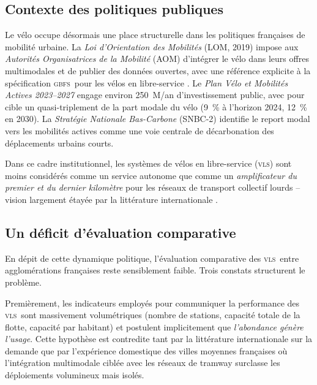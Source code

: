 \documentclass[11pt,a4paper]{article}
\newcommand{\VLS}{\textsc{vls}\xspace}
\newcommand{\GBFS}{\textsc{gbfs}\xspace}
\begin{document}
\subsection{Contexte des politiques publiques}
\label{sec:contexte-politique}

Le vélo occupe désormais une place structurelle dans les
politiques françaises de mobilité urbaine. La \emph{Loi
d'Orientation des Mobilités} (LOM, 2019) impose aux \emph{Autorités
Organisatrices de la Mobilité} (AOM) d'intégrer le vélo dans leurs
offres multimodales et de publier des données ouvertes, avec une
référence explicite à la spécification \GBFS\ pour les vélos en
libre-service \citep{Mobi2024}. Le \emph{Plan Vélo et Mobilités
Actives 2023--2027} engage environ \num{250}~M\EUR{}/an
d'investissement public, avec pour cible un quasi-triplement de
la part modale du vélo (\SI{9}{\percent} à l'horizon 2024,
\SI{12}{\percent} en 2030). La \emph{Stratégie Nationale
Bas-Carbone} (SNBC-2) identifie le report modal vers les
mobilités actives comme une voie centrale de décarbonation des
déplacements urbains courts.

Dans ce cadre institutionnel, les systèmes de vélos en
libre-service (\VLS) sont moins considérés comme un service
autonome que comme un \emph{amplificateur du premier et du dernier
kilomètre} pour les réseaux de transport collectif lourds
\citep{Fishman2016, Saberi2018} -- vision largement étayée par la
littérature internationale \citep{Pucher2010, Buehler2012}.

\subsection{Un déficit d'évaluation comparative}
\label{sec:contexte-eval}

En dépit de cette dynamique politique, l'évaluation comparative
des \VLS\ entre agglomérations françaises reste sensiblement
faible. Trois constats structurent le problème.

Premièrement, les indicateurs employés pour communiquer la
performance des \VLS\ sont massivement volumétriques (nombre de
stations, capacité totale de la flotte, capacité par habitant) et
postulent implicitement que \emph{l'abondance génère l'usage}.
Cette hypothèse est contredite tant par la littérature
internationale sur la demande \citep{FaghihImani2014,
FaghihImani2015, Eren2020} que par l'expérience domestique des
villes moyennes françaises où l'intégration multimodale ciblée
avec les réseaux de tramway surclasse les déploiements
volumineux mais isolés.
\end{document}
